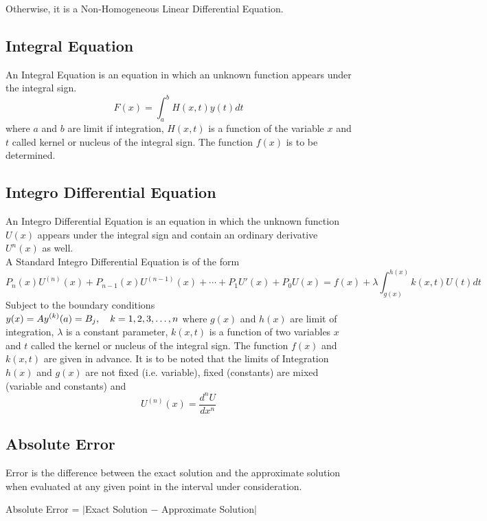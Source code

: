 \documentclass[12pt]{report}
\newcommand{\sps}{\\[0.2cm]}
\newcommand{\dsp}{\displaystyle}
\newcommand{\NI}{\noindent}
\begin{document}
	\NI Otherwise, it is a Non-Homogeneous Linear Differential Equation.
	
	\subsection{Integral Equation}
	An Integral Equation is an equation in which an unknown function appears under the integral sign.
	\begin{equation}
		F(x) = \int_{a}^{b}H(x,t)y(t)dt
	\end{equation}
	where $a$ and $b$ are limit if integration, $H(x,t)$ is a function of the variable $x$ and $t$ called kernel or nucleus of the integral sign. The function $f(x)$ is to be determined.
	
	\subsection{Integro Differential Equation}
	An Integro Differential Equation is an equation in which the unknown function $U(x)$ appears under the integral sign and contain an ordinary derivative $U^n(x)$ as well.\\
	
	\NI A Standard Integro Differential Equation is of the form 
	\begin{equation}
		P_n(x)U^{(n)}(x)+P_{n-1}(x) U^{(n-1)}(x) + \cdots + P_1U'(x)+P_0U(x) = f(x) +\lambda\int_{g(x)}^{h(x)}k(x,t)U(t)dt
	\end{equation}
	Subject to the boundary conditions\\
	$\dsp
		y(x)=A\sps
		y^{(k)}(a) = B_j, ~~~ k=1,2,3,\ldots,n\sps
	$
	where $g(x)$ and $h(x)$ are limit of integration, $\lambda$ is a constant parameter, $k(x,t)$ is a function of two variables $x$ and $t$ called the kernel or nucleus of the integral sign. The function $f(x)$ and $k(x,t)$ are given in advance. It is to be noted that the limits of Integration $h(x)$ and $g(x)$ are not fixed (i.e. variable), fixed (constants) are mixed (variable and constants) and 
	\begin{equation}
		U^{(n)}(x) = \frac{d^nU}{dx^n}
	\end{equation}
	
	\subsection{Absolute Error}
	Error is the difference between the exact solution and the approximate solution when evaluated at any given point in the interval under consideration.
	\begin{center}
		Absolute Error = $\big|$Exact Solution $-$ Approximate Solution$\big|$
	\end{center}
	
\end{document}
